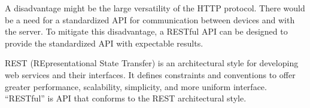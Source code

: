 A disadvantage might be the large versatility of the HTTP protocol. There would be
a need for a standardized API for communication between devices and with the
server. To mitigate this disadvantage, a RESTful API can be designed to provide
the standardized API with expectable results.


REST (REpresentational State Transfer) is an architectural style for developing
web services and their interfaces. It defines constraints and conventions to
offer greater performance, scalability, simplicity, and more uniform interface.
\cite{restdef} ``RESTful'' is API that conforms to the REST architectural style.